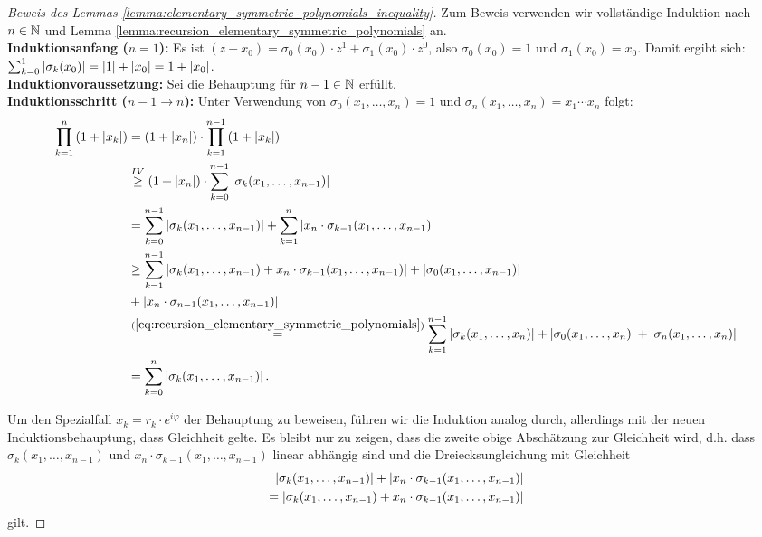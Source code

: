 \begin{proof}[Beweis des Lemmas \ref{lemma:elementary_symmetric_polynomials_inequality}]
    Zum Beweis verwenden wir vollständige Induktion nach $n \in \mathbb{N}$ und
    Lemma \ref{lemma:recursion_elementary_symmetric_polynomials} an.\\[0.5em]
    \textbf{Induktionsanfang (\boldmath$n=1$):}
    Es ist $ (z+x_0) = \sigma_0(x_0) \cdot z^1 + \sigma_1(x_0) \cdot z^0$,
    also $\sigma_0(x_0) = 1$ und $\sigma_1(x_0) = x_0$.
    Damit ergibt sich: $\sum_{k=0}^{1} \left\lvert \sigma_k(x_0) \right\rvert = \left\lvert 1 \right\rvert + \left\lvert x_0 \right\rvert = 1 + \left\lvert x_0 \right\rvert$.\\[0.5em]
%
    \noindent \textbf{Induktionvoraussetzung:}
    Sei die Behauptung für $n-1 \in \mathbb{N}$ erfüllt.\\[0.5em]
%
    \noindent \textbf{Induktionsschritt (\boldmath $n\!-\!1 \rightarrow n$):}
    Unter Verwendung von $\sigma_{0}(x_1, \dots, x_n) = 1$
    und $\sigma_{n}(x_1, \dots, x_n) = x_1 \cdots x_n$ folgt:
    \begin{equation*}
      \begin{split}
        \prod_{k=1}^{n} \left( 1 + \left\lvert x_k \right\rvert \right)
        &= ( 1 + \left\lvert x_n \right\rvert ) \cdot \prod_{k=1}^{n-1} \left( 1 + \left\lvert x_k \right\rvert \right)\\
        &\overset{IV}{\geq}  ( 1 + \left\lvert x_n \right\rvert ) \cdot \sum_{k=0}^{n-1} \left\lvert \sigma_{k}(x_1, \dots, x_{n-1}) \right\rvert\\
        &= \sum_{k=0}^{n-1} \left\lvert \sigma_{k}(x_1, \dots, x_{n-1}) \right\rvert
        + \sum_{k=1}^{n} \left\lvert x_n \cdot \sigma_{k-1}(x_1, \dots, x_{n-1}) \right\rvert\\
        &\geq \sum_{k=1}^{n-1} \left\lvert \sigma_{k}(x_1, \dots, x_{n-1}) + x_n \cdot \sigma_{k-1}(x_1, \dots, x_{n-1}) \right\rvert + \left\lvert \sigma_{0}(x_1, \dots, x_{n-1}) \right\rvert\\
        &+ \left\lvert x_n \cdot \sigma_{n-1}(x_1, \dots, x_{n-1}) \right\rvert\\
        &\overset{(\ref{eq:recursion_elementary_symmetric_polynomials})}{=}
        \sum_{k=1}^{n-1} \left\lvert \sigma_{k}(x_1, \dots, x_{n}) \right\rvert + \left\lvert \sigma_{0}(x_1, \dots, x_{n}) \right\rvert + \left\lvert \sigma_{n}(x_1, \dots, x_n) \right\rvert\\
        &= \sum_{k=0}^{n} \left\lvert \sigma_{k}(x_1, \dots, x_{n-1}) \right\rvert.
      \end{split}
    \end{equation*}

    Um den Spezialfall $x_k = r_k \cdot e^{i \varphi}$ der Behauptung zu beweisen,
    führen wir die Induktion analog durch, allerdings mit der neuen
    Induktionsbehauptung, dass Gleichheit gelte.  Es bleibt nur zu zeigen, dass
    die zweite obige Abschätzung zur Gleichheit wird, d.h. dass
    $\sigma_{k}(x_1, \dots, x_{n-1})$ und $x_n \cdot \sigma_{k-1}(x_1, \dots, x_{n-1})$
    linear abhängig sind und die Dreiecksungleichung mit Gleichheit
    \[
        \begin{split}
            \left\lvert \sigma_{k}(x_1, \dots, x_{n-1}) \right\rvert + \left\lvert x_n \cdot \sigma_{k-1}(x_1, \dots, x_{n-1}) \right\rvert\\
            = \left\lvert \sigma_{k}(x_1, \dots, x_{n-1}) + x_n \cdot \sigma_{k-1}(x_1, \dots, x_{n-1}) \right\rvert
        \end{split}
    \]
    gilt.


\end{proof}

